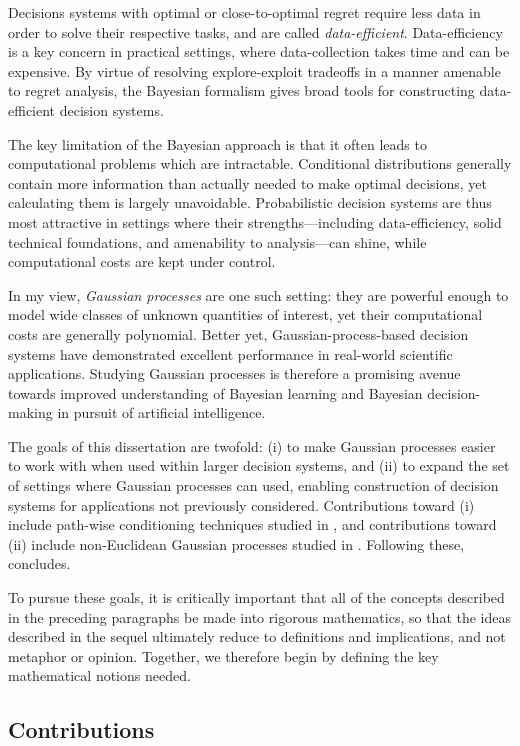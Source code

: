 \documentclass[11pt]{book}
\begin{document}
Decisions systems with optimal or close-to-optimal regret require less data in order to solve their respective tasks, and are called \emph{data-efficient}.
Data-efficiency is a key concern in practical settings, where data-collection takes time and can be expensive.
By virtue of resolving explore-exploit tradeoffs in a manner amenable to regret analysis, the Bayesian formalism gives broad tools for constructing data-efficient decision systems.

The key limitation of the Bayesian approach is that it often leads to computational problems which are intractable.
Conditional distributions generally contain more information than actually needed to make optimal decisions, yet calculating them is largely unavoidable.
Probabilistic decision systems are thus most attractive in settings where their strengths---including data-efficiency, solid technical foundations, and amenability to analysis---can shine, while computational costs are kept under control.

In my view, \emph{Gaussian processes} are one such setting: they are powerful enough to model wide classes of unknown quantities of interest, yet their computational costs are generally polynomial.
Better yet, Gaussian-process-based decision systems have demonstrated excellent performance in real-world scientific applications.
Studying Gaussian processes is therefore a promising avenue towards improved understanding of Bayesian learning and Bayesian decision-making in pursuit of artificial intelligence.

The goals of this dissertation are twofold: (i) to make Gaussian processes easier to work with when used within larger decision systems, and (ii) to expand the set of settings where Gaussian processes can used, enabling construction of decision systems for applications not previously considered.
Contributions toward (i) include path-wise conditioning techniques studied in , and contributions toward (ii) include non-Euclidean Gaussian processes studied in .
Following these,  concludes.

To pursue these goals, it is critically important that all of the concepts described in the preceding paragraphs be made into rigorous mathematics, so that the ideas described in the sequel ultimately reduce to definitions and implications, and not metaphor or opinion.
Together, we therefore begin by defining the key mathematical notions needed.

\subsection*{Contributions}
\end{document}
